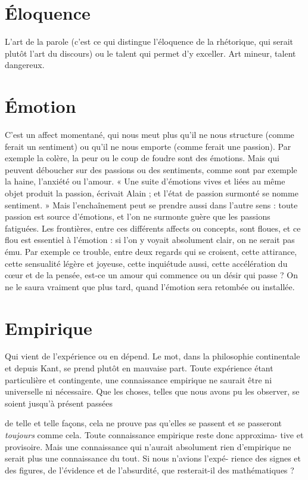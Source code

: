 \section{Éloquence}
L’art de la parole (c’est ce qui distingue l’éloquence de la rhétorique,
qui serait plutôt l’art du discours) ou le talent qui
permet d’y exceller. Art mineur, talent dangereux.

\section{Émotion}
C'est un affect momentané, qui nous meut plus qu’il ne nous
structure (comme ferait un sentiment) ou qu’il ne nous
emporte (comme ferait une passion). Par exemple la colère, la peur ou le coup
de foudre sont des émotions. Mais qui peuvent déboucher sur des passions ou
des sentiments, comme sont par exemple la haine, l’anxiété ou l’amour. « Une
suite d'émotions vives et liées au même objet produit la passion, écrivait Alain ;
et l’état de passion surmonté se nomme sentiment. » Mais l’enchaînement peut
se prendre aussi dans l’autre sens : toute passion est source d'émotions, et l’on
ne surmonte guère que les passions fatiguées. Les frontières, entre ces différents
affects ou concepts, sont floues, et ce flou est essentiel à l’émotion : si l’on y
voyait absolument clair, on ne serait pas ému. Par exemple ce trouble, entre
deux regards qui se croisent, cette attirance, cette sensualité légère et joyeuse,
cette inquiétude aussi, cette accélération du cœur et de la pensée, est-ce un
amour qui commence ou un désir qui passe ? On ne le saura vraiment que plus
tard, quand l'émotion sera retombée ou installée.

\section{Empirique}
Qui vient de l’expérience ou en dépend. Le mot, dans la philosophie
continentale et depuis Kant, se prend plutôt en
mauvaise part. Toute expérience étant particulière et contingente, une
connaissance empirique ne saurait être ni universelle ni nécessaire. Que les
choses, telles que nous avons pu les observer, se soient jusqu’à présent passées

de telle et telle façons, cela ne prouve pas qu’elles se passent et se passeront
{\it toujours} comme cela. Toute connaissance empirique reste donc approxima-
tive et provisoire. Mais une connaissance qui n'aurait absolument rien
d’empirique ne serait plus une connaissance du tout. Si nous n’avions l’expé-
rience des signes et des figures, de l’évidence et de l’absurdité, que resterait-il
des mathématiques ?

